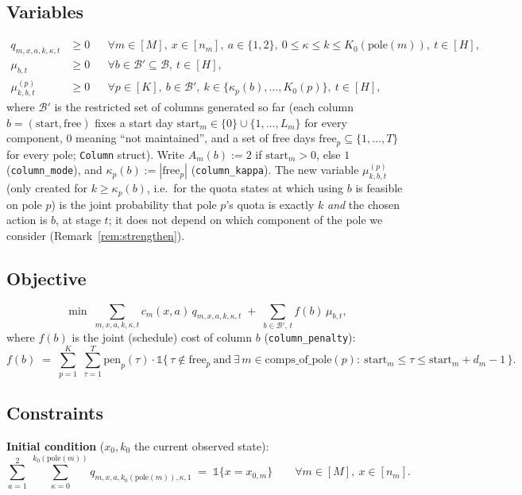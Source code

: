 \documentclass[11pt]{article}
\newcommand{\pole}{\mathrm{pole}}
\begin{document}
\subsection*{Variables}
\begin{align*}
  q_{m,x,a,k,\kappa,t} &\ge 0
  &&\forall m \in [M],\ x \in [n_m],\ a \in \{1,2\},\
     0 \le \kappa \le k \le K_0(\pole(m)),\ t \in [H], \\
  \mu_{b,t} &\ge 0
  &&\forall b \in \mathcal B' \subseteq \mathcal B,\ t \in [H], \\
  \mu^{(p)}_{k,b,t} &\ge 0
  &&\forall p \in [K],\ b \in \mathcal B',\ k \in \{\kappa_p(b),\dots,K_0(p)\},\ t \in [H],
\end{align*}
where $\mathcal B'$ is the restricted set of columns generated so far (each column
$b = (\mathrm{start}, \mathrm{free})$ fixes a start day $\mathrm{start}_m \in \{0\} \cup
\{1,\dots,L_m\}$ for every component, $0$ meaning ``not maintained'', and a set of free
days $\mathrm{free}_p \subseteq \{1,\dots,T\}$ for every pole; \texttt{Column} struct).
Write $A_m(b) := 2$ if $\mathrm{start}_m > 0$, else $1$ (\texttt{column\_mode}), and
$\kappa_p(b) := |\mathrm{free}_p|$ (\texttt{column\_kappa}). The new variable
$\mu^{(p)}_{k,b,t}$ (only created for $k \ge \kappa_p(b)$, i.e.\ for the quota states at
which using $b$ is feasible on pole $p$) is the joint probability that pole $p$'s quota is
exactly $k$ \emph{and} the chosen action is $b$, at stage $t$; it does not depend on which
component of the pole we consider (Remark~\ref{rem:strengthen}).

\subsection*{Objective}
\[
  \min \; \sum_{m,x,a,k,\kappa,t} c_m(x,a)\, q_{m,x,a,k,\kappa,t}
  \;+\; \sum_{b \in \mathcal B',\,t} f(b)\, \mu_{b,t},
\]
where $f(b)$ is the joint (schedule) cost of column $b$ (\texttt{column\_penalty}):
\[
  f(b) \;=\; \sum_{p=1}^K \; \sum_{\tau=1}^T \mathrm{pen}_p(\tau)\cdot
    \mathbb 1\bigl\{\, \tau \notin \mathrm{free}_p \ \text{and}\ \exists\, m \in
    \mathrm{comps\_of\_pole}(p):\ \mathrm{start}_m \le \tau \le \mathrm{start}_m+d_m-1 \,\bigr\}.
\]

\subsection*{Constraints}

\textbf{Initial condition} ($x_0, k_0$ the current observed state):
\[
  \sum_{a=1}^{2}\ \sum_{\kappa=0}^{k_0(\pole(m))} q_{m,x,a,k_0(\pole(m)),\kappa,1}
  \;=\; \mathbb 1\{x = x_{0,m}\}
  \qquad \forall m \in [M],\ x \in [n_m]. \tag{Init}
\]
\end{document}
